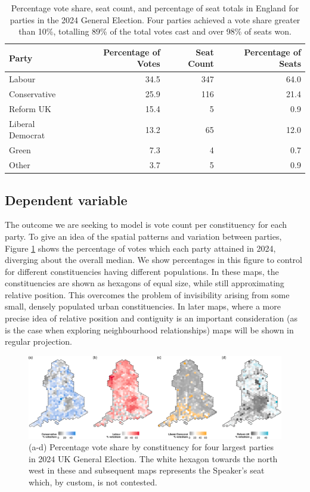\documentclass[webpdf,large,contemporary,namedate]{oup-authoring-template}
\theoremstyle{thmstyleone}
\theoremstyle{thmstyletwo}
\theoremstyle{thmstylethree}
\begin{document}
\begin{table}

\caption{\label{tab:elecsummary}Percentage vote share, seat count, and percentage of seat totals in England for parties in the 2024 General Election. Four parties achieved a vote share greater than 10\%, totalling 89\% of the total votes cast and over 98\% of seats won.}
\centering
\fontsize{8}{10}\selectfont
\begin{tabular}[t]{l|r|r|r}
\hline
Party & Percentage of Votes & Seat Count & Percentage of Seats\\
\hline
Labour & 34.5 & 347 & 64.0\\
\hline
Conservative & 25.9 & 116 & 21.4\\
\hline
Reform UK & 15.4 & 5 & 0.9\\
\hline
Liberal Democrat & 13.2 & 65 & 12.0\\
\hline
Green & 7.3 & 4 & 0.7\\
\hline
Other & 3.7 & 5 & 0.9\\
\hline
\end{tabular}
\end{table}

\subsection{Dependent variable}\label{dependent-variable}

The outcome we are seeking to model is vote count per constituency for
each party. To give an idea of the spatial patterns and variation
between parties, Figure \ref{fig:figvoteshare} shows the percentage of
votes which each party attained in 2024, diverging about the overall
median. We show percentages in this figure to control for different
constituencies having different populations. In these maps, the
constituencies are shown as hexagons of equal size, while still
approximating relative position. This overcomes the problem of
invisibility arising from some small, densely populated urban
constituencies. In later maps, where a more precise idea of relative
position and contiguity is an important consideration (as is the case
when exploring neighbourhood relationships) maps will be shown in
regular projection.

\begin{figure}[th]
\includegraphics[width=1\linewidth]{jrss_resubmission3_files/figure-latex/figvoteshare-1} \caption{(a-d) Percentage vote share by constituency for four largest parties in 2024 UK General Election. The white hexagon towards the north west in these and subsequent maps represents the Speaker's seat which, by custom, is not contested.}\label{fig:figvoteshare}
\end{figure}
\end{document}
